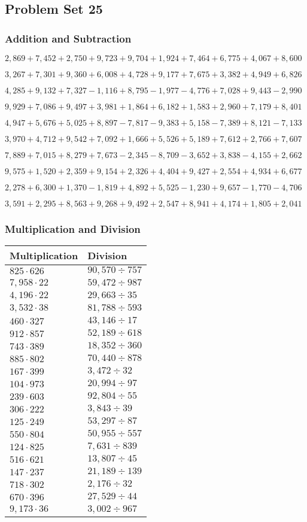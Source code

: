 \hypertarget{problem-set-25-3}{%
\subsection{Problem Set 25}\label{problem-set-25-3}}

\hypertarget{addition-and-subtraction-187}{%
\subsubsection{Addition and
Subtraction}\label{addition-and-subtraction-187}}

\(2,869+7,452+2,750+9,723+9,704+1,924+7,464+6,775+4,067+ 8,600\)

\(3,267+7,301+9,360+6,008+4,728+9,177+7,675+3,382+4,949+6,826\)

\(4,285+9,132+7,327-1,116+8,795-1,977-4,776+7,028+9,443-2,990\)

\(9,929+7,086+9,497+3,981+1,864+6,182+1,583+2,960+7,179+8,401\)

\(4,947+5,676+5,025+8,897-7,817-9,383+5,158-7,389+8,121-7,133\)

\(3,970+4,712+9,542+7,092+1,666+5,526+5,189+7,612+2,766+7,607\)

\(7,889+7,015+8,279+7,673-2,345-8,709-3,652+3,838-4,155+2,662\)

\(9,575+1,520+2,359+9,154+2,326+4,404+9,427+2,554+4,934+6,677\)

\(2,278+6,300+1,370-1,819+4,892+5,525-1,230+9,657-1,770-4,706\)

\(3,591+2,295+8,563+9,268+9,492+2,547+8,941+4,174+1,805+2,041\)

\hypertarget{multiplication-and-division-186}{%
\subsubsection{Multiplication and
Division}\label{multiplication-and-division-186}}

\begin{longtable}[]{@{}ll@{}}
\toprule
Multiplication & Division\tabularnewline
\midrule
\endhead
\(825\cdot626\) & \(90,570÷757\)\tabularnewline
\(7,958\cdot22\) & \(59,472÷987\)\tabularnewline
\(4,196\cdot22\) & \(29,663÷35\)\tabularnewline
\(3,532\cdot38\) & \(81,788÷593\)\tabularnewline
\(460\cdot327\) & \(43,146÷17\)\tabularnewline
\(912\cdot857\) & \(52,189÷618\)\tabularnewline
\(743\cdot389\) & \(18,352÷360\)\tabularnewline
\(885\cdot802\) & \(70,440÷878\)\tabularnewline
\(167\cdot399\) & \(3,472÷32\)\tabularnewline
\(104\cdot973\) & \(20,994÷97\)\tabularnewline
\(239\cdot603\) & \(92,804÷55\)\tabularnewline
\(306\cdot222\) & \(3,843÷39\)\tabularnewline
\(125\cdot249\) & \(53,297÷87\)\tabularnewline
\(550\cdot804\) & \(50,955÷557\)\tabularnewline
\(124\cdot825\) & \(7,631÷839\)\tabularnewline
\(516\cdot621\) & \(13,807÷45\)\tabularnewline
\(147\cdot237\) & \(21,189÷139\)\tabularnewline
\(718\cdot302\) & \(2,176÷32\)\tabularnewline
\(670\cdot396\) & \(27,529÷44\)\tabularnewline
\(9,173\cdot36\) & \(3,002÷967\)\tabularnewline
\bottomrule
\end{longtable}

